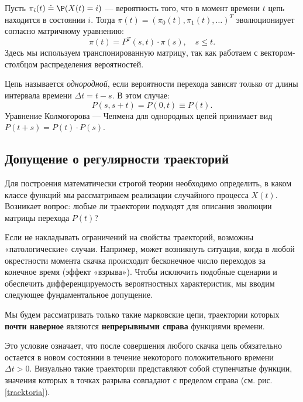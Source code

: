 Пусть $\pi_i(t) \doteq \P(X(t) = i)$ — вероятность того, что в момент времени $t$ цепь находится в состоянии $i$. Тогда $\pi(t) = (\pi_0(t), \pi_1(t), \dots)^T$ эволюционирует согласно матричному уравнению:
\[
\pi(t) = P^T(s, t) \cdot \pi(s), \quad s \leqslant t.
\]
Здесь мы используем транспонированную матрицу, так как работаем с вектором-столбцом распределения вероятностей.

Цепь называется \textit{однородной}, если вероятности перехода зависят только от длины интервала времени $\Delta t = t - s$. В этом случае:
\[
P(s, s+t) = P(0, t) \equiv P(t).
\]
Уравнение Колмогорова — Чепмена для однородных цепей принимает вид $P(t+s) = P(t) \cdot P(s)$.

\subsection{Допущение о регулярности траекторий}

Для построения математически строгой теории необходимо определить, в каком классе функций мы рассматриваем реализации случайного процесса $X(t)$. Возникает вопрос: любые ли траектории подходят для описания эволюции матрицы перехода $P(t)$?

Если не накладывать ограничений на свойства траекторий, возможны «патологические» случаи. Например, может возникнуть ситуация, когда в любой окрестности момента скачка происходит бесконечное число переходов за конечное время (эффект «взрыва»). Чтобы исключить подобные сценарии и обеспечить дифференцируемость вероятностных характеристик, мы вводим следующее фундаментальное допущение.

\begin{note}
    Мы будем рассматривать только такие марковские цепи, траектории которых \textbf{почти наверное} являются \textbf{непрерывными справа} функциями времени. 
\end{note}

Это условие означает, что после совершения любого скачка цепь обязательно остается в новом состоянии в течение некоторого положительного времени $\Delta t > 0$. Визуально такие траектории представляют собой ступенчатые функции, значения которых в точках разрыва совпадают с пределом справа (см. рис. \ref{traektoria}).

